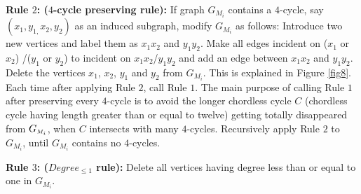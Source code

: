 \documentclass[review, 1p]{elsarticle}
\begin{document}
\noindent \textbf{Rule $2$: ($4$-cycle preserving rule):}\label{redtnrul1}
If graph $G_{M_{i}}$ contains a $4$-cycle, say $(x_{1},y_{1,}x_{2},y_{2})$ as an induced subgraph, modify $G_{M_{i}}$ as follows: Introduce two new vertices and label them as $x_{1}x_{2}$ and $y_{1}y_{2}$. Make all edges incident on ($x_{1}$ or $x_{2}$) /($y_{1}$ or $y_{2}$) to incident on $x_{1}x_{2}$/$y_{1}y_{2}$ and add an edge between $x_{1}x_{2}$ and $y_{1}y_{2}$. Delete the vertices $x_{1}$, $x_{2}$, $y_{1}$ and $y_{2}$ from $G_{M_{i}}$. This is explained in Figure \ref{fig8}.\\
\noindent Each time after applying Rule $2$, call Rule $1$. The main purpose of calling Rule $1$ after preserving every $4$-cycle is to avoid the longer chordless cycle $C$ (chordless cycle having length greater than or equal to twelve) getting totally disappeared from $G_{\mathsmaller M_{i}}$, when $C$ intersects with many $4$-cycles. Recursively apply Rule $2$ to $G_{M_{i}}$, until $G_{M_{i}}$ contains no $4$-cycles.

\noindent \textbf{Rule $3$: ($Degree_{\leq 1}$ rule):} Delete all vertices having degree less than or equal to one in $G_{M_{i}}$.
\end{document}
